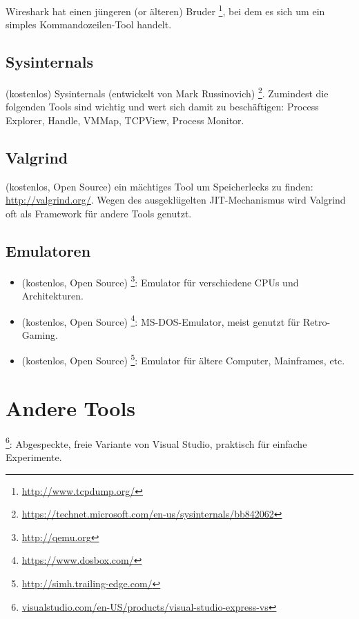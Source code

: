Wireshark hat einen jüngeren (or älteren) Bruder \footnote{\url{http://www.tcpdump.org/}},
bei dem es sich um ein simples Kommandozeilen-Tool handelt.

\subsection{Sysinternals}

(kostenlos) Sysinternals (entwickelt von Mark Russinovich)
\footnote{\url{https://technet.microsoft.com/en-us/sysinternals/bb842062}}.
Zumindest die folgenden Tools sind wichtig und wert sich damit zu beschäftigen:
Process Explorer, Handle, VMMap, TCPView, Process Monitor.

\subsection{Valgrind}

(kostenlos, Open Source) ein mächtiges Tool um Speicherlecks zu finden: \url{http://valgrind.org/}.
Wegen des ausgeklügelten \ac{JIT}-Mechanismus wird Valgrind oft als Framework für andere Tools genutzt.


\subsection{Emulatoren}

\begin{itemize}
\item (kostenlos, Open Source) \footnote{\url{http://qemu.org}}: Emulator für verschiedene CPUs und Architekturen.

\item (kostenlos, Open Source) \footnote{\url{https://www.dosbox.com/}}: MS-DOS-Emulator, meist genutzt für Retro-Gaming.

\item (kostenlos, Open Source) \footnote{\url{http://simh.trailing-edge.com/}}: Emulator für ältere Computer, Mainframes, etc.
\end{itemize}

\section{Andere Tools}

\footnote{\href{http://go.yurichev.com/17034}{visualstudio.com/en-US/products/visual-studio-express-vs}}:
Abgespeckte, freie Variante von Visual Studio, praktisch für einfache Experimente.

